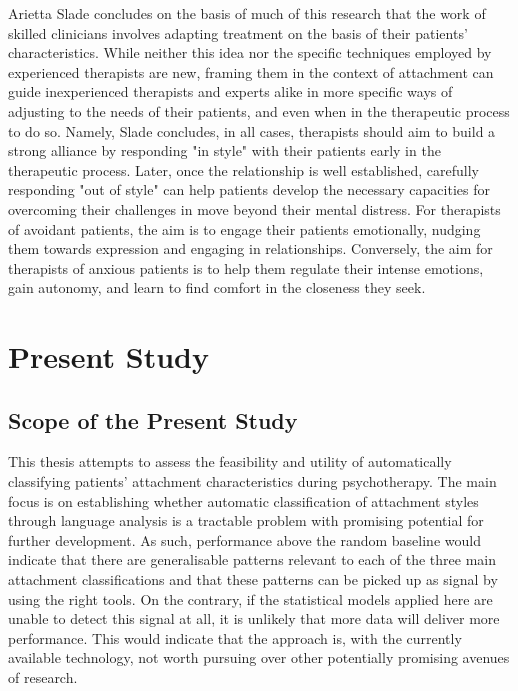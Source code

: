 \documentclass[12pt]{report}
\begin{document}
Arietta Slade \citeyear{Slade2016} concludes on the basis of much of this research that the work of skilled clinicians involves adapting treatment on the basis of their patients' characteristics. While neither this idea nor the specific techniques employed by experienced therapists are new, framing them in the context of attachment can guide inexperienced therapists and experts alike in more specific ways of adjusting to the needs of their patients, and even when in the therapeutic process to do so.
Namely, Slade concludes, in all cases, therapists should aim to build a strong alliance by responding "in style" with their patients early in the therapeutic process.
Later, once the relationship is well established, carefully responding "out of style" can help patients develop the necessary capacities for overcoming their challenges in move beyond their mental distress.
For therapists of avoidant patients, the aim is to engage their patients emotionally, nudging them towards expression and engaging in relationships.
Conversely, the aim for therapists of anxious patients is to help them regulate their intense emotions, gain autonomy, and learn to find comfort in the closeness they seek.

\chapter{Present Study}
\section{Scope of the Present Study}
This thesis attempts to assess the feasibility and utility of automatically classifying patients' attachment characteristics during psychotherapy.
The main focus is on establishing whether automatic classification of attachment styles through language analysis is a tractable problem with promising potential for further development.
As such, performance above the random baseline would indicate that there are generalisable patterns relevant to each of the three main attachment classifications and that these patterns can be picked up as signal by using the right tools.
On the contrary, if the statistical models applied here are unable to detect this signal at all, it is unlikely that more data will deliver more performance.
This would indicate that the approach is, with the currently available technology, not worth pursuing over other potentially promising avenues of research.
\end{document}
